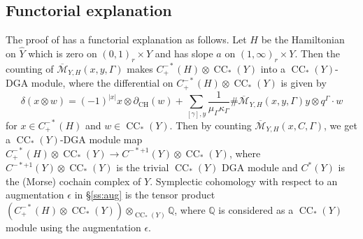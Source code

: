 \documentclass[reqno,11pt]{amsart}
\numberwithin{equation}{section}
\def\R{\mathbb{R}}
\def\Q{{\mathbb Q}}
\def\cM{{\mathcal M}}
\DeclareMathOperator{\CH}{CH}
\DeclareMathOperator{\CC}{CC}
\begin{document}

\subsection{Functorial explanation}\label{ss:43}
The proof of  has a functorial explanation as follows. Let $H$ be the Hamiltonian on $\widehat{Y}$ which is zero on $(0,1)_r\times Y$ and has slope $a$ on $(1,\infty)_r\times Y$. Then the counting of $\overline{\cM}_{Y,H}(x,y,\Gamma)$ makes $C^{-*}_+(H)\otimes \CC_*(Y)$ into a $\CC_*(Y)$-DGA module, where the differential on $C^{-*}_+(H)\otimes \CC_*(Y)$ is given by 
$$\delta(x\otimes w) = (-1)^{|x|}x\otimes \partial_{\CH}(w)+ \sum_{[\gamma],y}\frac{1}{\mu_{\Gamma}\kappa_{\Gamma}} \# \overline{\cM}_{Y,H}(x,y,\Gamma) y\otimes q^{\Gamma}\cdot w$$
for $x\in C_+^{-*}(H)$ and $w\in \CC_*(Y)$. Then by counting $\overline{\cM}_{Y,H}(x,C,\Gamma)$, we get a $\CC_*(Y)$-DGA module map $C^{-*}_+(H)\otimes\CC_*(Y)\to C^{-*+1}(Y)\otimes \CC_*(Y)$, where $C^{-*+1}(Y)\otimes \CC_*(Y)$ is the trivial $\CC_*(Y)$ DGA module and $C^*(Y)$ is the (Morse) cochain complex of $Y$. Symplectic cohomology with respect to an augmentation $\epsilon$ in \S\ref{ss:aug} is the tensor product $(C_+^{-*}(H)\otimes \CC_*(Y))\otimes_{\CC_*(Y)} \Q$, where $\Q$ is considered as a $\CC_*(Y)$ module using the augmentation $\epsilon$.
\end{document}

